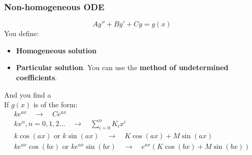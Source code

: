 \subsubsection{Non-homogeneous ODE}
$$Ay''+By'+Cy=g(x)$$
You define:
\begin{itemize}
    \item \textbf{Homogeneous solution}
    \item \textbf{Particular solution}.
You can use the \textbf{method of undetermined coefficients}.
\end{itemize}
And you find a  \\
If $g(x)$ is of the form:
\begin{align}
    k e^{a x} \quad \rightarrow \quad C e^{a x}\\
    k x^n, n = 0, 1, 2 \ldots \quad \rightarrow \quad  \sum_{i=0}^n K_i x^i\\
    k \cos(a x) \text{ or } k \sin(a x) \quad \rightarrow \quad  K \cos(a x) + M \sin(a x)\\
    k e^{a x} \cos(b x) \text{ or } ke^{a x} \sin(b x) \quad \rightarrow \quad e^{a x} (K \cos(b x) + M \sin(b x))
\end{align}

